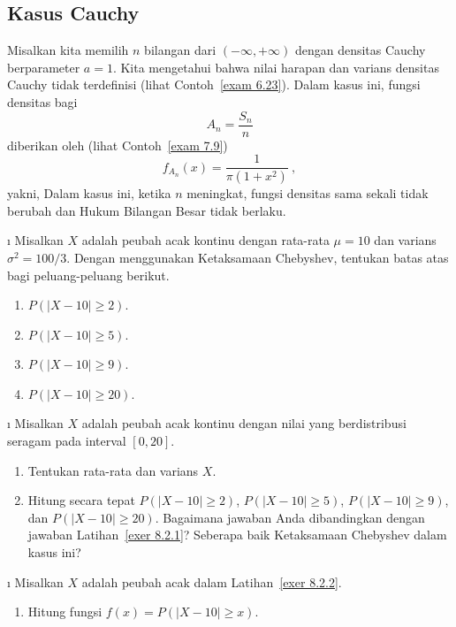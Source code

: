 {\subsection*{Kasus Cauchy}
\begin{example}\label{exam 8.2.5}
Misalkan kita memilih $n$ bilangan dari $(-\infty,+\infty)$ dengan densitas Cauchy
berparameter $a = 1$.  Kita mengetahui bahwa nilai harapan dan
varians densitas Cauchy tidak terdefinisi (lihat Contoh~\ref{exam 6.23}).  Dalam kasus ini,
fungsi densitas bagi
$$
A_n = \frac {S_n}n
$$
diberikan oleh (lihat Contoh~\ref{exam 7.9})
$$
f_{A_n}(x) = \frac 1{\pi(1 + x^2)}\ ,
$$
yakni,   Dalam
kasus ini, ketika $n$ meningkat, fungsi densitas sama sekali tidak berubah dan
Hukum Bilangan Besar tidak berlaku.
\end{example}

\exercises
\begin{LJSItem}

\i\label{exer 8.2.1} Misalkan $X$ adalah peubah acak kontinu dengan rata-rata $\mu =
10$ dan varians $\sigma^2 = 100/3$.  Dengan menggunakan Ketaksamaan Chebyshev, tentukan
batas atas bagi peluang-peluang berikut.
\begin{enumerate}
\item $P(|X - 10| \geq 2)$.

\item $P(|X - 10| \geq 5)$.

\item $P(|X - 10| \geq 9)$.

\item $P(|X - 10| \geq 20)$.
\end{enumerate}

\i\label{exer 8.2.2} Misalkan $X$ adalah peubah acak kontinu dengan nilai yang
berdistribusi seragam pada interval $[0,20]$.
\begin{enumerate}
\item Tentukan rata-rata dan varians $X$.

\item Hitung secara tepat $P(|X - 10| \geq 2)$, $P(|X - 10| \geq 5)$, $P(|X - 10| \geq
9)$, dan $P(|X - 10| \geq 20)$.  Bagaimana jawaban Anda dibandingkan dengan jawaban
Latihan~\ref{exer 8.2.1}?  Seberapa baik Ketaksamaan Chebyshev dalam kasus ini?
\end{enumerate}

\i\label{exer 8.2.3} Misalkan $X$ adalah peubah acak dalam Latihan~\ref{exer
8.2.2}.
\begin{enumerate}
\item Hitung fungsi $f(x) = P(|X - 10| \geq x)$.


\end{enumerate}
\end{LJSItem}}
